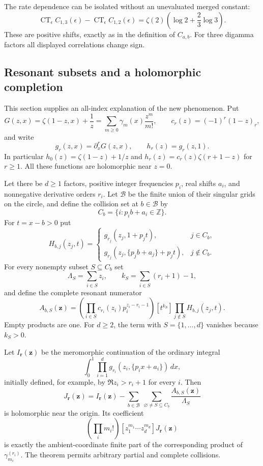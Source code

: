 The rate dependence can be isolated without an unevaluated merged
constant:
\begin{equation}\label{cl:rate-difference}
 \operatorname{CT}_{\epsilon}C_{1,3}(\epsilon)
 -\operatorname{CT}_{\epsilon}C_{1,2}(\epsilon)
 =\zeta(2)\left(\log2+\frac23\log3\right).
\end{equation}
These are positive shifts, exactly as in the definition of $C_{a,b}$.
For three digamma factors all displayed correlations change sign.

\subsection{Resonant subsets and a holomorphic completion}
\label{cl:subsets}

This section supplies an all-index explanation of the new phenomenon.
Put
\[
 G(z,x)=\zeta(1-z,x)+\frac1z
     =\sum_{m\ge0}\gamma_m(x)\frac{z^m}{m!},\qquad
 c_r(z)=(-1)^r(1-z)_r,
\]
and write
\[
 g_r(z,x)=\partial_x^rG(z,x),\qquad h_r(z)=g_r(z,1).
\]
In particular $h_0(z)=\zeta(1-z)+1/z$ and
$h_r(z)=c_r(z)\zeta(r+1-z)$ for $r\ge1$. All these functions are
holomorphic near $z=0$.

Let there be $d\ge1$ factors, positive integer frequencies $p_i$, real
shifts $a_i$, and nonnegative derivative orders $r_i$. Let
$\mathcal B$ be the finite union of their singular grids on the circle,
and define the collision set at $b\in\mathcal B$ by
\[
 C_b=\{i:p_i b+a_i\in\mathbb Z\}.
\]
For $t=x-b>0$ put
\[
 H_{b,j}(z_j,t)=
 \begin{cases}
 g_{r_j}(z_j,1+p_jt),&j\in C_b,\\
 g_{r_j}(z_j,\{p_jb+a_j\}+p_jt),&j\notin C_b.
 \end{cases}
\]
For every nonempty subset $S\subseteq C_b$ set
\[
 \Lambda_S=\sum_{i\in S}z_i,\qquad
 k_S=\sum_{i\in S}(r_i+1)-1,
\]
and define the complete resonant numerator
\[
 A_{b,S}(\boldsymbol z)=
 \left(\prod_{i\in S}c_{r_i}(z_i)p_i^{z_i-r_i-1}\right)
 [t^{k_S}]\prod_{j\notin S}H_{b,j}(z_j,t).
\]
Empty products are one. For $d\ge2$, the term with
$S=\{1,\dots,d\}$ vanishes because $k_S>0$.

\begin{theorem}
\label{cl:allfactor}
Let $I_{\boldsymbol r}(\boldsymbol z)$ be the meromorphic continuation
of the ordinary integral
\[
 \int_0^1\prod_{i=1}^d
      g_{r_i}(z_i,\{p_i x+a_i\})\,dx,
\]
initially defined, for example, by $\Re z_i>r_i+1$ for every $i$.
Then
\begin{equation}\label{cl:completion}
 J_{\boldsymbol r}(\boldsymbol z)
 =I_{\boldsymbol r}(\boldsymbol z)
       -\sum_{b\in\mathcal B}\ \sum_{\varnothing\ne S\subseteq C_b}
              \frac{A_{b,S}(\boldsymbol z)}{\Lambda_S}
\end{equation}
is holomorphic near the origin. Its coefficient
\[
 \left(\prod_i m_i!\right)[z_1^{m_1}\cdots z_d^{m_d}]
              J_{\boldsymbol r}(\boldsymbol z)
\]
is exactly the ambient-coordinate finite part of the corresponding
product of $\gamma_{m_i}^{(r_i)}$. The theorem permits arbitrary partial
and complete collisions.
\end{theorem}

